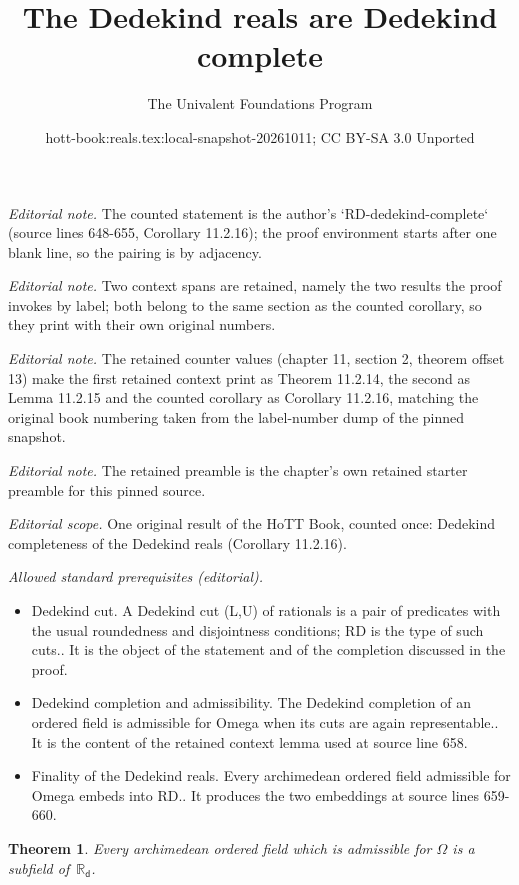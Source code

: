 \documentclass[10pt,a4paper]{article}
\title{The Dedekind reals are Dedekind complete}
\author{The Univalent Foundations Program}
\date{hott-book:reals.tex:local-snapshot-20261011; CC BY-SA 3.0 Unported}
\newcounter{chapter}
\newcommand{\RD}{\ensuremath{\mathbb{R}_\mathsf{d}}\xspace} %
\newtheorem{thm}{Theorem}[section]
\theoremstyle{definition}
\theoremstyle{remark}
\numberwithin{equation}{section}
\begin{document}
\maketitle
\setcounter{chapter}{11}
\setcounter{section}{2}
\setcounter{thm}{13}
\noindent\textit{Editorial note.} The counted statement is the author's `RD-dedekind-complete` (source lines 648-655, Corollary 11.2.16); the proof environment starts after one blank line, so the pairing is by adjacency.\par\medskip
\noindent\textit{Editorial note.} Two context spans are retained, namely the two results the proof invokes by label; both belong to the same section as the counted corollary, so they print with their own original numbers.\par\medskip
\noindent\textit{Editorial note.} The retained counter values (chapter 11, section 2, theorem offset 13) make the first retained context print as Theorem 11.2.14, the second as Lemma 11.2.15 and the counted corollary as Corollary 11.2.16, matching the original book numbering taken from the label-number dump of the pinned snapshot.\par\medskip
\noindent\textit{Editorial note.} The retained preamble is the chapter's own retained starter preamble for this pinned source.\par\medskip
\noindent\textit{Editorial scope.} One original result of the HoTT Book, counted once: Dedekind completeness of the Dedekind reals (Corollary 11.2.16).\par\medskip
\noindent\textit{Allowed standard prerequisites (editorial).}\begin{itemize}
\item Dedekind cut. A Dedekind cut (L,U) of rationals is a pair of predicates with the usual roundedness and disjointness conditions; RD is the type of such cuts.. It is the object of the statement and of the completion discussed in the proof.
\item Dedekind completion and admissibility. The Dedekind completion of an ordered field is admissible for Omega when its cuts are again representable.. It is the content of the retained context lemma used at source line 658.
\item Finality of the Dedekind reals. Every archimedean ordered field admissible for Omega embeds into RD.. It produces the two embeddings at source lines 659-660.
\end{itemize}\medskip
\begin{thm} \label{RD-final-field}
  Every archimedean ordered field which is admissible for $\Omega$ is a subfield of~$\RD$.
\end{thm}
\end{document}
